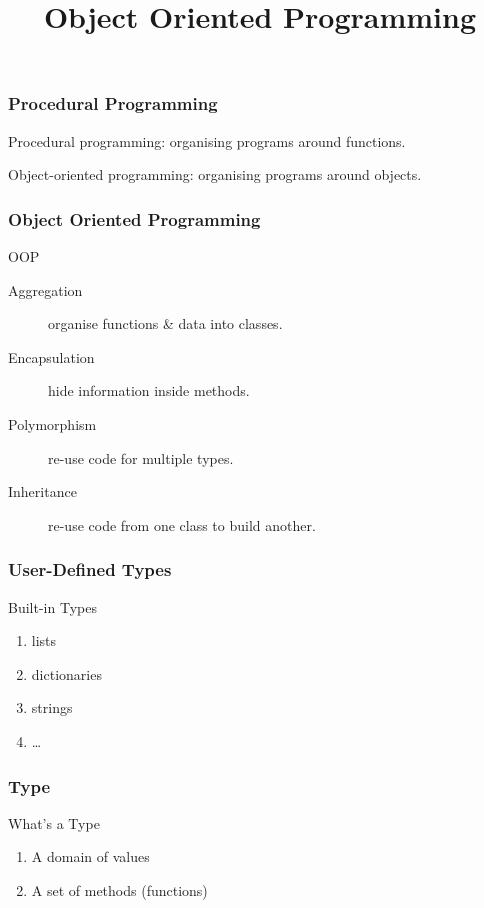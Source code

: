 
\title{Object Oriented Programming}


\frame{\maketitle}

\begin{frame}[fragile]
\frametitle{Procedural Programming}
\alert{Procedural programming}: organising programs around functions.

\alert{Object-oriented programming}: organising programs around objects.
\end{frame}

\begin{frame}[fragile] 
\frametitle{Object Oriented Programming}

\begin{block}{OOP}
\begin{description}
\item[Aggregation] organise functions \& data into classes.
\item[Encapsulation] hide information inside methods.
\item[Polymorphism] re-use code for multiple types.
\item[Inheritance] re-use code from one class to build another.
\end{description}
\end{block}
\end{frame}

\begin{frame}[fragile] 
\frametitle{User-Defined Types}

\begin{block}{Built-in Types}
\begin{enumerate}
\item lists
\item dictionaries
\item strings
\item \ldots
\end{enumerate}
\end{block}
\end{frame}

\begin{frame}[fragile] 
\frametitle{Type}
\begin{block}{What's a Type}
\begin{enumerate}
\item A domain of values
\item A set of methods (functions)
\end{enumerate}
\end{block}

\end{frame}

